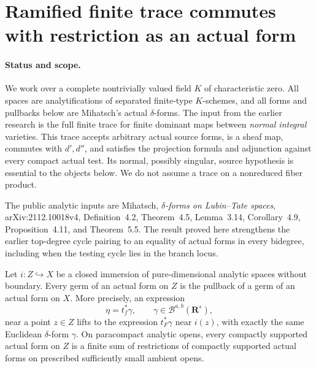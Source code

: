 
\section{Ramified finite trace commutes with restriction as an actual form}
\label{g10t:ramified-base-change}

\paragraph{Status and scope.}
We work over a complete nontrivially valued field $K$ of
characteristic zero. All spaces are analytifications of separated
finite-type $K$-schemes, and all forms and pullbacks below are
Mihatsch's actual $\delta$-forms. The input from the earlier research
is the full finite trace for finite dominant maps between
\emph{normal integral} varieties. This trace accepts arbitrary
actual source forms, is a sheaf map, commutes with $d',d''$, and
satisfies the projection formula and adjunction against every compact
actual test. Its normal, possibly singular, source hypothesis is
essential to the objects below. We do not assume a trace on a
nonreduced fiber product.

The public analytic inputs are Mihatsch, \emph{$\delta$-forms on
Lubin--Tate spaces}, arXiv:2112.10018v4, Definition~4.2,
Theorem~4.5, Lemma~3.14, Corollary~4.9, Proposition~4.11,
and Theorem~5.5. The result proved here strengthens the earlier
top-degree cycle pairing to an equality of actual forms in every
bidegree, including when the testing cycle lies in the branch locus.

\begin{lemma}
\label{g10t:actual-test-lifting}
Let $i:Z\hookrightarrow X$ be a closed immersion of pure-dimensional
analytic spaces without boundary. Every germ of an actual form on
$Z$ is the pullback of a germ of an actual form on $X$. More
precisely, an expression
\[
                 \eta=t_f^*\gamma,
       \qquad \gamma\in\mathcal B^{a,b}(\mathbf R^s),
\]
near a point $z\in Z$ lifts to the expression $t_F^*\gamma$ near
$i(z)$, with exactly the same Euclidean $\delta$-form $\gamma$.
On paracompact analytic opens, every compactly supported actual
form on $Z$ is a finite sum of restrictions of compactly supported
actual forms on prescribed sufficiently small ambient opens.
\end{lemma}

